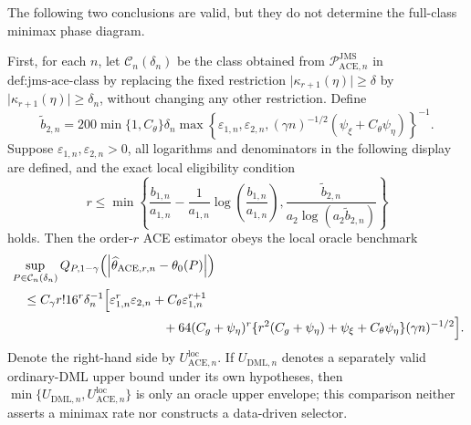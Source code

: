 The following two conclusions are valid, but they do not determine the full-class minimax phase diagram.

First, for each \(n\), let \(\mathcal C_n(\delta_n)\) be the class obtained from \(\mathcal P_{\mathrm{ACE},n}^{\mathrm{JMS}}\) in \(\text{def:jms-ace-class}\) by replacing the fixed restriction \(\lvert\kappa_{r+1}(\eta)\rvert\ge\delta\) by \(\lvert\kappa_{r+1}(\eta)\rvert\ge\delta_n\), without changing any other restriction.  Define
\[
 \widetilde b_{2,n}
 =200\min\{1,C_{\theta}\}\delta_n
 \max\!\left\{
   \varepsilon_{1,n},\varepsilon_{2,n},
   (\gamma n)^{-1/2}(\psi_{\xi}+C_{\theta}\psi_{\eta})
 \right\}^{-1}.
\]
Suppose \(\varepsilon_{1,n},\varepsilon_{2,n}>0\), all logarithms and denominators in the following display are defined, and the exact local eligibility condition
\[
 r\le
 \min\!\left\{
   \frac{b_{1,n}}{a_{1,n}}
   -\frac{1}{a_{1,n}}\log\!\left(\frac{b_{1,n}}{a_{1,n}}\right),
   \frac{\widetilde b_{2,n}}{a_2\log(a_2\widetilde b_{2,n})}
 \right\}
\]
holds.  Then the order-\(r\) ACE estimator obeys the local oracle benchmark
\[
\begin{aligned}
 &\sup_{P\in\mathcal C_n(\delta_n)}
 Q_{P,1-\gamma}
 \!\left(\left|\widehat\theta_{\mathrm{ACE},r,n}-\theta_0(P)\right|\right)\\
 &\quad\le
 C_{\gamma}r!16^r\delta_n^{-1}
 \Bigl[
   \varepsilon_{1,n}^r\varepsilon_{2,n}
   +C_{\theta}\varepsilon_{1,n}^{r+1}\\
 &\hspace{42mm}
   +64(C_g+\psi_{\eta})^r
    \{r^2(C_g+\psi_{\eta})+\psi_{\xi}+C_{\theta}\psi_{\eta}\}
    (\gamma n)^{-1/2}
 \Bigr].
\end{aligned}
\]
Denote the right-hand side by \(U_{\mathrm{ACE},n}^{\mathrm{loc}}\).  If \(U_{\mathrm{DML},n}\) denotes a separately valid ordinary-DML upper bound under its own hypotheses, then \(\min\{U_{\mathrm{DML},n},U_{\mathrm{ACE},n}^{\mathrm{loc}}\}\) is only an oracle upper envelope; this comparison neither asserts a minimax rate nor constructs a data-driven selector.

